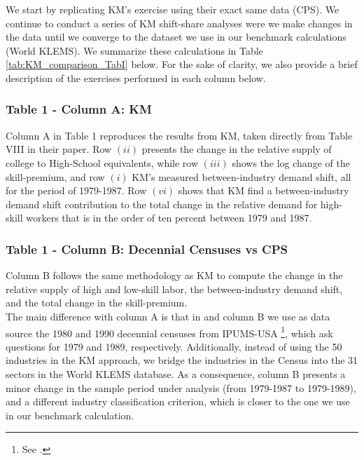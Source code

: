 \documentclass[10pt]{article}
\begin{document}
We start by replicating KM's exercise using their exact same data (CPS). We continue to conduct a series of KM shift-share analyses were we make changes in the data until we converge to the dataset we use in our benchmark calculations (World KLEMS). We summarize these calculations in Table \ref{tab:KM_comparison_TabI} below. For the sake of clarity, we also provide a brief description of the exercises performed in each column below.

\subsubsection*{Table 1 - Column A: KM}
Column A in Table 1 reproduces the results from KM, taken directly from Table VIII in their paper. Row $(ii)$ presents the change in the relative supply of college to High-School equivalents, while row $(iii)$ shows the log change of the skill-premium, and row $(i)$ KM's measured between-industry demand shift, all for the period of 1979-1987. Row $(vi)$ shows that KM find a between-industry demand shift contribution to the total change in the relative demand for high-skill workers that is in the order of ten percent between 1979 and 1987. 

\subsubsection*{Table 1 - Column B: Decennial Censuses vs CPS}
Column B follows the same methodology as KM to compute the change in the relative supply of high and low-skill labor, the between-industry demand shift, and the total change in the skill-premium.\\

The main difference with column A is that in and column B we use as data source the 1980 and 1990 decennial censuses from IPUMS-USA \footnote{See \citet{ipums_usa}.}, which ask questions for 1979 and 1989, respectively. Additionally, instead of using the 50 industries in the KM approach, we bridge the industries in the Census into the 31 sectors in the World KLEMS database. As a consequence, column B presents a minor change in the sample period under analysis (from 1979-1987 to 1979-1989), and a different industry classification criterion, which is closer to the one we use in our benchmark calculation.\\ 
\end{document}
